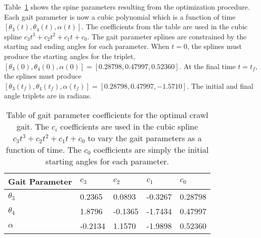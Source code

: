 


Table~\ref{tab:optimal_parameters} shows the spine parameters resulting from the
optimization procedure. 
Each gait parameter is now a cubic polynomial which is a function of time 
$[\theta_3 (t), \theta_4 (t), \alpha (t)]$.
The coefficients from the table are used in the cubic spline $c_3 t^3 + c_2 t^2 + c_1 t + c_0$.
The gait parameter splines are constrained by the starting and ending angles for each parameter.
When $t = 0$, the splines must produce the starting angles for the triplet, 
$[\theta_3 (0), \theta_4 (0), \alpha (0)] = [0.28798, 0.47997, 0.52360]$.
At the final time $t = t_f$, the splines must produce 
$[\theta_3 (t_f), \theta_4 (t_f), \alpha (t_f)] = [0.28798, 0.47997, -1.5710]$. 
The initial and final angle triplets are in radians.

\begin{table}
  \centering
  \begin{tabularx}{0.75\textwidth}{|l|l|l|l|X|}
    \hline
    \textbf{Gait Parameter} & \textbf{$c_3$} & \textbf{$c_2$} & \textbf{$c_1$} & \textbf{$c_0$} \\  \hline\hline
    $\theta_3$              &   0.2365       &  0.0893        & -0.3267        &  0.28798       \\ 
    $\theta_4$              &   1.8796       & -0.1365        & -1.7434        &  0.47997       \\  
    $\alpha$                &  -0.2134       &  1.1570        & -1.9898        &  0.52360       \\  \hline
  \end{tabularx} 
  
  \caption{Table of gait parameter coefficients for the optimal crawl gait. 
           The $c_i$ coefficients are used in the cubic spline 
           $c_3 t^3 + c_2 t^2 + c_1 t + c_0$ to vary the gait parameters as a function of time.
           The $c_0$ coefficients are simply the initial starting angles for each parameter.}
  \label{tab:optimal_parameters}
\end{table}

